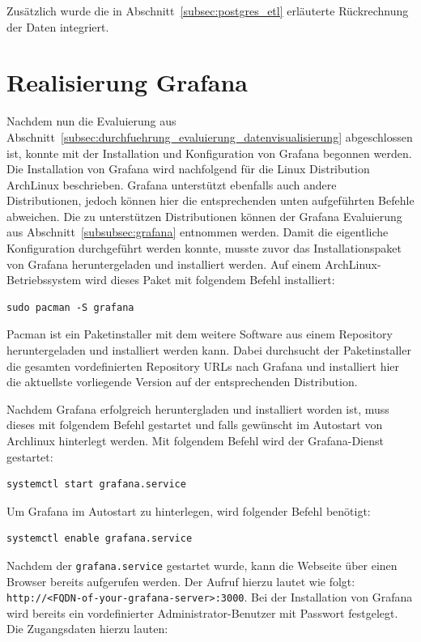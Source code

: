Zusätzlich wurde die in Abschnitt~\ref{subsec:postgres_etl} erläuterte
Rückrechnung der Daten integriert.
\nl%

\section{Realisierung Grafana}
\label{sec:realisierung_grafana}
Nachdem nun die Evaluierung aus
Abschnitt~\ref{subsec:durchfuehrung_evaluierung_datenvisualisierung}
abgeschlossen ist, konnte mit der Installation und Konfiguration von Grafana
begonnen werden. Die Installation von Grafana wird nachfolgend für die Linux
Distribution ArchLinux beschrieben. Grafana unterstützt ebenfalls auch andere
Distributionen, jedoch können hier die entsprechenden unten aufgeführten
Befehle abweichen. Die zu unterstützen Distributionen können der Grafana
Evaluierung aus Abschnitt~\ref{subsubsec:grafana} entnommen werden. Damit die
eigentliche Konfiguration durchgeführt werden konnte, musste zuvor das
Installationspaket von Grafana heruntergeladen und installiert werden. Auf
einem ArchLinux\hyp{}Betriebssystem wird dieses Paket mit folgendem Befehl
installiert:

\begin{verbatim}
sudo pacman -S grafana
\end{verbatim}

Pacman ist ein Paketinstaller mit dem weitere Software aus einem
\gls{Repository} heruntergeladen und installiert werden kann. Dabei durchsucht
der Paketinstaller die gesamten vordefinierten \gls{Repository} URLs nach
Grafana und installiert hier die aktuellste vorliegende Version auf der
entsprechenden Distribution.

Nachdem Grafana erfolgreich heruntergladen und installiert worden ist, muss
dieses mit folgendem Befehl gestartet und falls gewünscht im Autostart von
Archlinux hinterlegt werden. Mit folgendem Befehl wird der Grafana\hyp{}Dienst
gestartet:

\begin{verbatim}
systemctl start grafana.service
\end{verbatim}

Um Grafana im Autostart zu hinterlegen, wird folgender Befehl benötigt:

\begin{verbatim}
systemctl enable grafana.service
\end{verbatim}

Nachdem der \texttt{grafana.service} gestartet wurde, kann die Webseite über
einen Browser bereits aufgerufen werden. Der Aufruf hierzu lautet wie folgt:
\texttt{http://<FQDN-of-your-grafana-server>:3000}. Bei der Installation von
Grafana wird bereits ein vordefinierter Administrator\hyp{}Benutzer mit
Passwort festgelegt. Die Zugangsdaten hierzu lauten:

